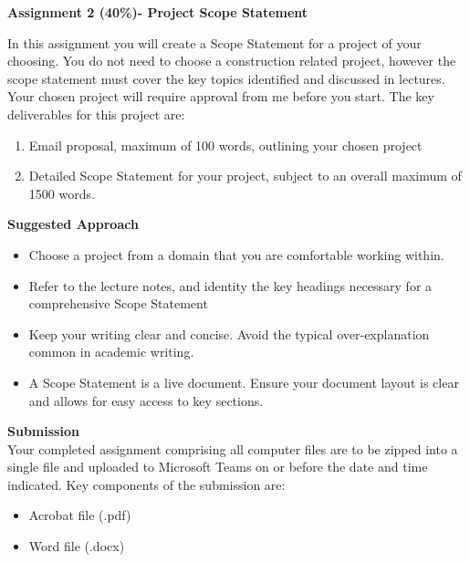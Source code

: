 

	
\begin{flushleft}
\Large\textbf{Assignment 2 (40\%)- Project Scope Statement}\\
\end{flushleft}

In this assignment you will create a Scope Statement for a project of your choosing.  You do not need to choose a construction related project, however the scope statement must cover the key topics identified and discussed in lectures.  Your chosen project will require approval from me before you start.  The key deliverables for this project are:

\begin{enumerate}
	\item Email proposal, maximum of 100 words, outlining your chosen project
	\item Detailed Scope Statement for your project, subject to an overall maximum of 1500 words.
\end{enumerate}


\textbf{Suggested Approach}

\begin{itemize}
	\item Choose a project from a domain that you are comfortable working within.  
	\item Refer to the lecture notes, and identity the key headings necessary for a comprehensive Scope Statement
	\item Keep your writing clear and concise.  Avoid the typical over-explanation common in academic writing.
	\item A Scope Statement is a live document.  Ensure your document layout is clear and allows for easy access to key sections. 

\end{itemize}


\textbf{Submission}\\
Your completed assignment comprising all computer files are to be zipped into a single file and uploaded to Microsoft Teams on or before the date and time indicated.  Key components of the submission are:
\begin{itemize}
	\item Acrobat file (.pdf)
	\item Word file (.docx)
\end{itemize}



